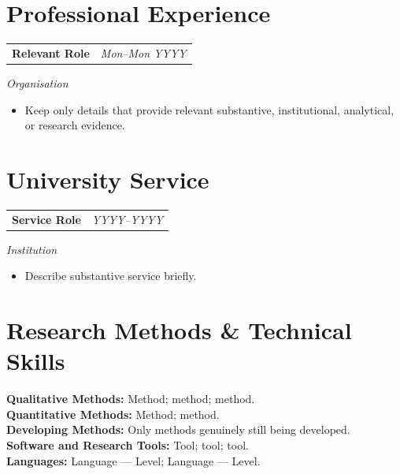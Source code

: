 \documentclass[10pt,a4paper]{article}
\makeatletter
\newcommand{\datedline}[2]{%
  \begin{tabularx}{\textwidth}{@{}Xr@{}}
    #1 & \textit{#2}
  \end{tabularx}%
}
\newcommand{\roleentry}[3]{%
  \datedline{{\fontsize{10.3pt}{11.2pt}\selectfont\textbf{#1}}}{#3}\vspace{1.25pt}
  \textit{#2}\par\vspace{1.25pt}
}
\makeatother
\begin{document}
\section{Professional Experience}
\roleentry{Relevant Role}{Organisation}{Mon--Mon YYYY}
\begin{itemize}
  \item Keep only details that provide relevant substantive, institutional, analytical, or research evidence.
\end{itemize}

\section{University Service}
\roleentry{Service Role}{Institution}{YYYY--YYYY}
\begin{itemize}
  \item Describe substantive service briefly.
\end{itemize}

\section{\texorpdfstring{Research Methods \& Technical Skills}{Research Methods and Technical Skills}}
\textbf{Qualitative Methods:} Method; method; method.\\[0.5pt]
\textbf{Quantitative Methods:} Method; method.\\[0.5pt]
\textbf{Developing Methods:} Only methods genuinely still being developed.\\[0.5pt]
\textbf{Software and Research Tools:} Tool; tool; tool.\\[0.5pt]
\textbf{Languages:} Language --- Level; Language --- Level.
\end{document}
